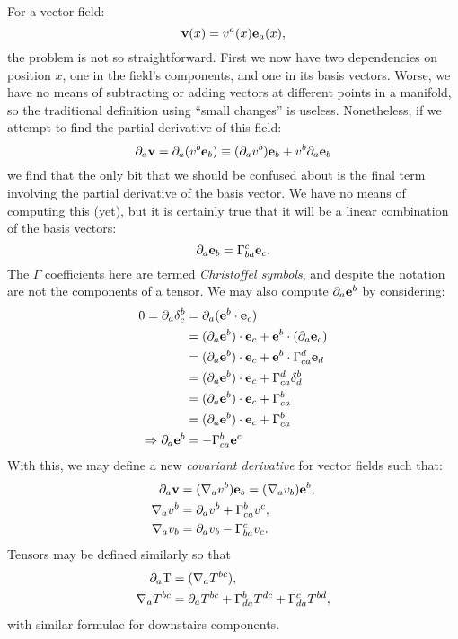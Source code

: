 For a vector field:
\begin{equation}
 \mathbf{v}(x) = v^a(x)\mathbf{e}_a(x),
  \label{eqn:cos:vector_field}
\end{equation}
the problem is not so straightforward. First we now have two dependencies on position $x$, one in the field's components, and one in its basis vectors. Worse, we have no means of subtracting or adding vectors at different points in a manifold, so the traditional definition using ``small changes'' is useless. Nonetheless, if we attempt to find the partial derivative of this field:
\begin{equation}
  \partial_a\mathbf{v} = \partial_a(v^b\mathbf{e}_b) \equiv (\partial_a v^b) \mathbf{e}_b + v^b \partial_a\mathbf{e}_b
  \label{eqn:cos:partial_expand}
\end{equation}
we find that the only bit that we should be confused about is the final term involving the partial derivative of the basis vector. We have no means of computing this (yet), but it is certainly true that it will be a linear combination of the basis vectors:
\begin{equation}
  \partial_a\mathbf{e}_b = \Gamma^c_{ba} \mathbf{e}_c.
  \label{eqn:cos:gamma_def}
\end{equation}
The $\Gamma$ coefficients here are termed {\em Christoffel symbols}, and despite the notation are not the components of a tensor. We may also compute $\partial_a \mathbf{e}^b$ by considering:
\begin{align}
  0 = \partial_a \delta^b_c &= \partial_a (\mathbf{e}^b\cdot\mathbf{e}_c)  
  \nonumber\\
  &= (\partial_a\mathbf{e}^b)\cdot\mathbf{e}_c + \mathbf{e}^b\cdot(\partial_a\mathbf{e}_c)
  \nonumber \\
  &= (\partial_a\mathbf{e}^b)\cdot\mathbf{e}_c + \mathbf{e}^b\cdot\Gamma^d_{ca} \mathbf{e}_d 
  \nonumber \\
  &= (\partial_a\mathbf{e}^b)\cdot\mathbf{e}_c + \Gamma^d_{ca} \delta^b_d
  \nonumber \\
  &= (\partial_a\mathbf{e}^b)\cdot\mathbf{e}_c + \Gamma^b_{ca} 
  \nonumber \\
  &= (\partial_a\mathbf{e}^b)\cdot\mathbf{e}_c + \Gamma^b_{ca} 
  \nonumber \\
  \Rightarrow \partial_a\mathbf{e}^b
  &=  - \Gamma^b_{ca} \mathbf{e}^c
  \label{eqn:cos:chris_deriv}
\end{align}
With this, we may define a new {\em covariant derivative\/} for vector fields such that:
\begin{align}
  \partial_a\mathbf{v} &= (\nabla_a v^b) \mathbf{e}_b = (\nabla_a v_b) \mathbf{e}^b,
  \\
   \nabla_a v^b &= \partial_a v^b + \Gamma^b_{ca}v^c,
   \\
   \nabla_a v_b &= \partial_a v_b - \Gamma^c_{ba}v_c.
\end{align}
Tensors may be defined similarly so that
\begin{align}
  \partial_a \mathrm{T} &= (\nabla_a T^{bc}),
  \\
  \nabla_a T^{bc} &= \partial_a T^{bc} + \Gamma^b_{da}T^{dc} + \Gamma^c_{da}T^{bd},
\end{align}
with similar formulae for downstairs components.

